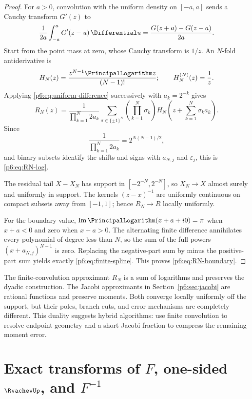 \documentclass[11pt]{article}
\theoremstyle{definition}
\theoremstyle{remark}
\newcommand{\eps}{\varepsilon}
\begin{document}
\begin{proof}
For \(a>0\), convolution with the uniform density on \([-a,a]\) sends a Cauchy transform
\(G'(z)\) to
\begin{equation}
 \frac1{2a}\int_{-a}^{a}G'(z-u)\,\Differential u
 =\frac{G(z+a)-G(z-a)}{2a}.                                  \label{p6:eq:uniform-difference}
\end{equation}
Start from the point mass at zero, whose Cauchy transform is \(1/z\).  An \(N\)-fold
antiderivative is
\[
 H_N(z)=\frac{z^{N-1}\PrincipalLogarithm z}{(N-1)!};
 \qquad H_N^{(N)}(z)=\frac1z.
\]
Applying \eqref{p6:eq:uniform-difference} successively with \(a_k=2^{-k}\) gives
\[
 R_N(z)=\frac{1}{\prod_{k=1}^{N}2a_k}
 \sum_{\sigma\in\{\pm1\}^N}
 \left(\prod_{k=1}^{N}\sigma_k\right)
 H_N\!\left(z+\sum_{k=1}^{N}\sigma_k a_k\right).
\]
Since
\[
 \frac1{\prod_{k=1}^{N}2a_k}=2^{N(N-1)/2},
\]
and binary subsets identify the shifts and signs with \(a_{N,j}\) and \(\eps_j\), this is
\eqref{p6:eq:RN-log}.

The residual tail \(X-X_N\) has support in \([-2^{-N},2^{-N}]\), so \(X_N\to X\)
almost surely and uniformly in support.  The kernels \((z-x)^{-1}\) are uniformly
continuous on compact subsets away from \([-1,1]\); hence \(R_N\to R\) locally uniformly.

For the boundary value, \(\operatorname{Im}\PrincipalLogarithm(x+a+i0)=\pi\) when \(x+a<0\) and zero
when \(x+a>0\).  The alternating finite difference annihilates every polynomial of degree
less than \(N\), so the sum of the full powers \((x+a_{N,j})^{N-1}\) is zero.  Replacing the
negative-part sum by minus the positive-part sum yields exactly
\eqref{p6:eq:finite-spline}.  This proves \eqref{p6:eq:RN-boundary}.
\end{proof}

\begin{remark}
The finite-convolution approximant \(R_N\) is a sum of logarithms and preserves the dyadic
construction.  The Jacobi approximants in Section~\ref{p6:sec:jacobi} are rational functions
and preserve moments.  Both converge locally uniformly off the support, but their poles,
branch cuts, and error mechanisms are completely different.  This duality suggests hybrid
algorithms: use finite convolution to resolve endpoint geometry and a short Jacobi fraction
to compress the remaining moment error.
\end{remark}

\section[Exact transforms of F, one-sided up, and inverse F]{Exact transforms of \(F\), one-sided \(\RvachevUp\), and \(F^{-1}\)}\label{p6:sec:fabius-transforms}
\end{document}
